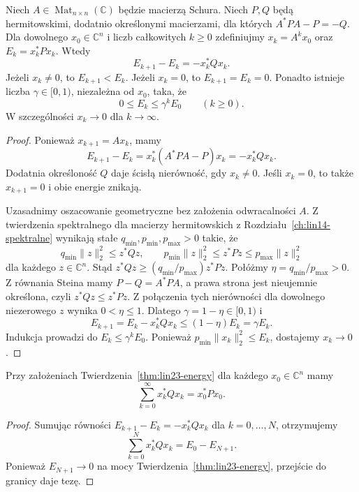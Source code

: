 \begin{twierdzenie}
\label{thm:lin23-energy}
Niech \(A\in\operatorname{Mat}_{n\times n}(\mathbb C)\)
będzie macierzą Schura.
Niech \(P,Q\) będą hermitowskimi,
dodatnio określonymi macierzami,
dla których \(A^*PA-P=-Q\).
Dla dowolnego \(x_0\in\mathbb C^n\)
i liczb całkowitych \(k\ge0\)
zdefiniujmy
\(x_k=A^kx_0\)
oraz \(E_k=x_k^*Px_k\).
Wtedy
\[
 E_{k+1}-E_k=-x_k^*Qx_k.
\]
Jeżeli \(x_k\ne0\),
to \(E_{k+1}<E_k\).
Jeżeli \(x_k=0\), to
\(E_{k+1}=E_k=0\).
Ponadto istnieje liczba
\(\gamma\in[0,1)\),
niezależna od \(x_0\),
taka, że
\[
 0\le E_k\le\gamma^kE_0
 \qquad(k\ge0).
\]
W szczególności
\(x_k\to0\) dla \(k\to\infty\).
\end{twierdzenie}
\begin{proof}
Ponieważ \(x_{k+1}=Ax_k\),
mamy
\[
 E_{k+1}-E_k
 =x_k^*(A^*PA-P)x_k
 =-x_k^*Qx_k.
\]
Dodatnia określoność \(Q\)
daje ścisłą nierówność,
gdy \(x_k\ne0\).
Jeśli \(x_k=0\), to
także \(x_{k+1}=0\)
i obie energie znikają.

Uzasadnimy oszacowanie
geometryczne bez założenia
odwracalności \(A\).
Z twierdzenia spektralnego
dla macierzy hermitowskich
z Rozdziału~\ref{ch:lin14-spektralne}
wynikają stałe
\(q_{\min},p_{\min},p_{\max}>0\)
takie, że
\[
 q_{\min}\|z\|_2^2\le z^*Qz,
 \qquad
 p_{\min}\|z\|_2^2
 \le z^*Pz\le p_{\max}\|z\|_2^2
\]
dla każdego \(z\in\mathbb C^n\).
Stąd
\(z^*Qz\ge
(q_{\min}/p_{\max})z^*Pz\).
Połóżmy
\(\eta=q_{\min}/p_{\max}>0\).
Z równania Steina mamy
\(P-Q=A^*PA\),
a prawa strona jest
nieujemnie określona,
czyli \(z^*Qz\le z^*Pz\).
Z połączenia tych nierówności
dla dowolnego niezerowego \(z\)
wynika \(0<\eta\le1\).
Dlatego
\(\gamma=1-\eta\in[0,1)\)
i
\[
 E_{k+1}
 =E_k-x_k^*Qx_k
 \le(1-\eta)E_k=\gamma E_k.
\]
Indukcja prowadzi do
\(E_k\le\gamma^kE_0\).
Ponieważ
\(p_{\min}\|x_k\|_2^2\le E_k\),
dostajemy \(x_k\to0\).
\end{proof}

\begin{wniosek}
\label{cor:lin23-energy-sum}
Przy założeniach
Twierdzenia~\ref{thm:lin23-energy}
dla każdego \(x_0\in\mathbb C^n\)
mamy
\[
 \sum_{k=0}^{\infty}x_k^*Qx_k
 =x_0^*Px_0.
\]
\end{wniosek}
\begin{proof}
Sumując równości
\(E_{k+1}-E_k=-x_k^*Qx_k\)
dla \(k=0,\ldots,N\),
otrzymujemy
\[
 \sum_{k=0}^{N}x_k^*Qx_k
 =E_0-E_{N+1}.
\]
Ponieważ \(E_{N+1}\to0\)
na mocy
Twierdzenia~\ref{thm:lin23-energy},
przejście do granicy
daje tezę.
\end{proof}

